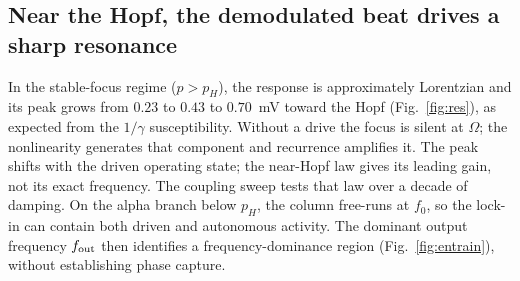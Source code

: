 \documentclass[11pt,a4paper]{article}
\providecommand{\DIFaddtex}[1]{{\protect\color{blue} \sf #1}} %
\providecommand{\DIFdeltex}[1]{{\protect\color{red} \scriptsize #1}} %
\providecommand{\DIFaddbegin}{} %
\providecommand{\DIFaddend}{} %
\providecommand{\DIFdelbegin}{} %
\providecommand{\DIFdelend}{} %
\providecommand{\DIFadd}[1]{\texorpdfstring{\DIFaddtex{#1}}{#1}} %
\providecommand{\DIFdel}[1]{\texorpdfstring{\DIFdeltex{#1}}{}} %
\begin{document}
\DIFdelbegin \subsection{\DIFdel{Near the Hopf, the demodulated beat drives a sharp resonance}}
\addtocounter{subsection}{-1}%
\DIFdelend In the stable-focus regime ($p>p_H$), the response is approximately Lorentzian
and its peak grows from $0.23$ to $0.43$ to $0.70$~mV toward the Hopf
(Fig.~\ref{fig:res}), as expected from the
$1/\gamma$ susceptibility. Without a drive the focus is silent at $\Omega$;
the nonlinearity generates that component and recurrence amplifies it.
\DIFaddbegin \DIFadd{The peak shifts with the driven operating state; the near-Hopf law gives
its leading gain, not its exact frequency. The coupling sweep tests that law
over a decade of damping.
}\DIFaddend On the alpha branch below $p_H$, the column free-runs at $f_0$, so the lock-in
can contain both driven and autonomous activity. The dominant output frequency
$f_{\rm out}$ then identifies a frequency-dominance region
(Fig.~\ref{fig:entrain}), without establishing phase capture.
\end{document}
